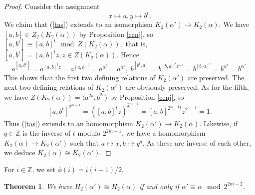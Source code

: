 \documentclass{amsart}
\newtheorem{theorem}{Theorem}[section]
\theoremstyle{definition}
\theoremstyle{remark}
\newcommand \Z{{\mathbb Z}}
\begin{document}
\begin{proof} Consider the assignment
\begin{equation}
\label{tas}
x\mapsto a, y\mapsto b^t.
\end{equation}
We claim that (\ref{tas}) extends to an isomorphism $K_2(\alpha')\to K_2(\alpha)$. We have $[a,b]\in Z_2(K_2(\alpha))$ by
Proposition \ref{cenj}, so
$
[a,b^t]\equiv [a,b]^t\mod Z(K_2(\alpha)),
$
that is,
$
[a,b^t]=[a,b]^t z, z\in Z(K_2(\alpha)).
$
Hence
$$
a^{[a,b^t]}=a^{[a,b]^t z}=a^{[a,b]^t}=a^{\alpha^t}=a^{\alpha'},\; b^{[b^t,a]}=b^{[b,a]^t z^{-1}}=b^{[b,a]^t}=b^{\alpha^t}=b^{\alpha'}.
$$
This shows that the first two defining relations of $K_2(\alpha')$ are preserved. The next two defining relations of
$K_2(\alpha')$ are obviously preserved.  As for the fifth, we have $Z(K_2(\alpha))=\langle a^{2s},b^{2s}\rangle$ by Proposition \ref{cenj},
so
$$
[a,b^t]^{2^{m-1}}=([a,b]^t z)^{2^{m-1}}=[a,b]^{2^{m-1} t} z^{2^{m-1}}=1.
$$
Thus (\ref{tas}) extends to an homomorphism $K_2({\alpha'})\to K_2(\alpha)$. Likewise, if $q\in\Z$ is the inverse
of $t$ modulo $2^{2m-1}$, we have a homomorphism $K_2(\alpha)\to K_2({\alpha'})$ such that
$a\mapsto x, b\mapsto y^q$. As these are inverse of each other, we deduce $K_2(\alpha)\cong K_2({\alpha'})$.
\end{proof}

For $i\in\Z$, we set $\phi(i)=i(i-1)/2$.

\begin{theorem}\label{h2} We have $H_2(\alpha')\cong H_2(\alpha)$ if and only if $\alpha'\equiv\alpha\mod 2^{2m-2}$.
\end{theorem}
\end{document}
